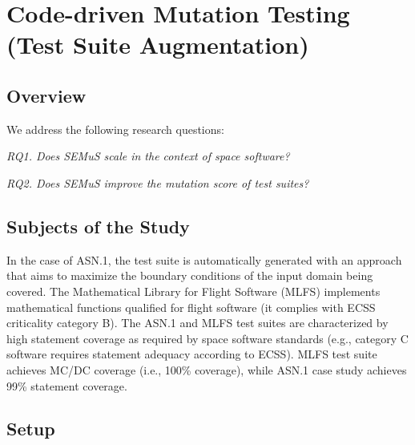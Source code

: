 \clearpage
\section{Code-driven Mutation Testing (Test Suite Augmentation)}
\label{sec:testGeneration:codeDriven}

\subsection{Overview}

We address the following research questions:

\emph{RQ1. Does SEMuS scale in the context of space software?}

\emph{RQ2. Does SEMuS improve the mutation score of test suites?}

\subsection{Subjects of the Study}

In the case of ASN.1, the test suite is automatically generated with an approach that aims to maximize the boundary conditions of the input domain being covered.
The Mathematical Library for Flight Software (MLFS) implements mathematical functions qualified for flight software (it complies with ECSS criticality category B).
The ASN.1 and MLFS test suites are characterized by high statement coverage as required by space software standards (e.g., category C software requires statement adequacy according to ECSS). MLFS test suite achieves MC/DC coverage (i.e., 100\% coverage), while ASN.1 case study achieves 99\% statement coverage. 


\subsection{Setup}



